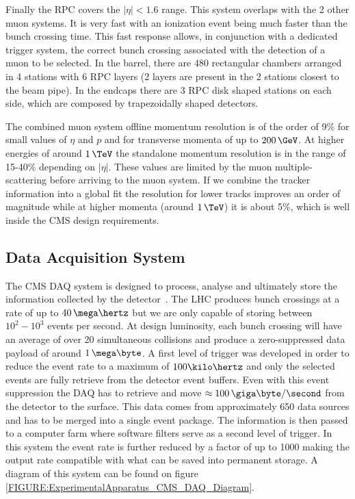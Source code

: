 Finally the \gls{RPC} covers the $|\eta|<1.6$ range. This system overlaps with the 2 other muon systems. It is very fast with an ionization event being much faster than the bunch crossing time. This fast response allows, in conjunction with a dedicated trigger system, the correct bunch crossing associated with the detection of a muon to be selected. In the barrel, there are 480 rectangular chambers arranged in 4 stations with 6 \gls{RPC} layers (2 layers are present in the 2 stations closest to the beam pipe). In the endcaps there are 3 \gls{RPC} disk shaped stations on each side, which are composed by trapezoidally shaped detectors.

The combined muon system offline momentum resolution is of the order of 9\% for small values of $\eta$ and $p$ and for transverse momenta of up to $200\,\GeV$. At higher energies of around $1\,\TeV$ the standalone momentum resolution is in the range of 15-40\% depending on $|\eta|$. These values are limited by the muon multiple-scattering before arriving to the muon system. If we combine the tracker information into a global fit the resolution for lower \pt tracks improves an order of magnitude while at higher momenta (around $1\,\TeV$) it is about 5\%, which is well inside the \gls{CMS} design requirements.

\subsection{Data Acquisition System}
\label{SUBSECTION:ExperimentalApparatus_CMS_DAQ}


The \gls{CMS} \gls{DAQ} system is designed to process, analyse and ultimately store the information collected by the detector~\cite{CMSTDR:CMSTridasTDRVol2}. The \gls{LHC} produces bunch crossings at a rate of up to $40\,\mega\hertz$ but we are only capable of storing between $10^2-10^3$ events per second. At design luminosity, each bunch crossing will have an average of over 20 simultaneous collisions and produce a zero-suppressed data payload of around $1\,\mega\byte$. A first level of trigger was developed in order to reduce the event rate to a maximum of $100 \kilo\hertz$ and only the selected events are fully retrieve from the detector event buffers. Even with this event suppression the \gls{DAQ} has to retrieve and move $\approx 100\, \giga\byte/\second$ from the detector to the surface. This data comes from approximately 650 data sources and has to be merged into a single event package. The information is then passed to a computer farm where software filters serve as a second level of trigger. In this system the event rate is further reduced by a factor of up to 1000 making the output rate compatible with what can be saved into permanent storage. A diagram of this system can be found on figure \ref{FIGURE:ExperimentalApparatus_CMS_DAQ_Diagram}.

